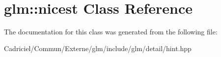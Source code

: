 \hypertarget{classglm_1_1nicest}{}\section{glm\+:\+:nicest Class Reference}
\label{classglm_1_1nicest}


The documentation for this class was generated from the following file\+:\begin{DoxyCompactItemize}
\item 
Cadriciel/\+Commun/\+Externe/glm/include/glm/detail/hint.\+hpp\end{DoxyCompactItemize}
